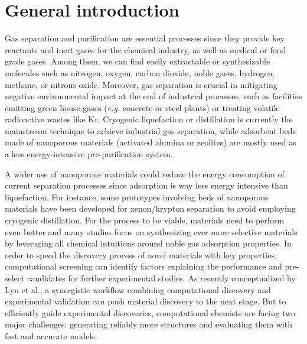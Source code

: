 
\chapter*{General introduction}







Gas separation and purification are essential processes since they provide key reactants and inert gases for the chemical industry, as well as medical or food grade gases. Among them, we can find easily extractable or synthesizable molecules such as nitrogen, oxygen, carbon dioxide, noble gases, hydrogen, methane, or nitrous oxide. Moreover, gas separation is crucial in mitigating negative environmental impact at the end of industrial processes, such as facilities emitting green house gases (\emph{e.g.} concrete or steel plants) or treating volatile radioactive wastes like Kr. Cryogenic liquefaction or distillation is currently the mainstream technique to achieve industrial gas separation, while adsorbent beds made of nanoporous materials (activated alumina or zeolites) are mostly used as a less energy-intensive pre-purification system.\autocite{kerry2007industrial}

A wider use of nanoporous materials could reduce the energy consumption of current separation processes since adsorption is way less energy intensive than liquefaction.\autocite{national2019research} For instance, some prototypes involving beds of nanoporous materials have been developed for xenon/krypton separation to avoid employing cryogenic distillation.\autocite{Banerjee2018} For the process to be viable, materials need to perform even better and many studies focus on synthesizing ever more selective materials by leveraging all chemical intuitions around noble gas adsorption properties.\autocite{Chen_2014, Li_2019, Pei_2022} In order to speed the discovery process of novel materials with key properties, computational screening can identify factors explaining the performance and pre-select candidates for further experimental studies. As recently conceptualized by Lyu et al., a synergistic workflow combining computational discovery and experimental validation can push material discovery to the next stage.\autocite{Lyu_2020, Jablonka_2022} But to efficiently guide experimental discoveries, computational chemists are facing two major challenges: generating reliably more structures and evaluating them with fast and accurate models.

